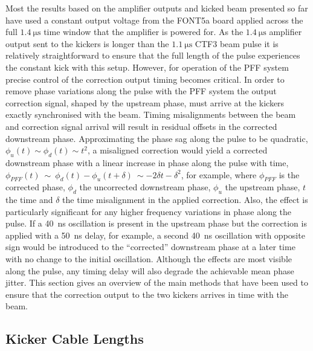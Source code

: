 
Most the results based on the amplifier outputs and kicked beam presented so far have used a constant output voltage from the FONT5a board applied across the full \(1.4~\mathrm{\mu s}\) time window that the amplifier is powered for. As the \(1.4~\mathrm{\mu s}\) amplifier output sent to the kickers is longer than the \(1.1~\mathrm{\mu s}\) CTF3 beam pulse it is relatively straightforward to ensure that the full length of the pulse experiences the constant kick with this setup. However, for operation of the PFF system precise control of the correction output timing becomes critical. In order to remove phase variations along the pulse with the PFF system the output correction signal, shaped by the upstream phase, must arrive at the kickers exactly synchronised with the beam. Timing misalignments between the beam and correction signal arrival will result in residual offsets in the corrected downstream phase. Approximating the phase sag along the pulse to be quadratic, \(\phi_{u}(t) \sim \phi_{d}(t) \sim t^2\), a misaligned correction would yield a corrected downstream phase with a linear increase in phase along the pulse with time, \(\phi_{PFF}(t)~\sim~\phi_d(t)-\phi_u(t+\delta)~\sim -2\delta t - \delta^2\), for example, where \(\phi_{PFF}\) is the corrected phase, \(\phi_{d}\) the uncorrected downstream phase, \(\phi_{u}\) the upstream phase, \(t\) the time and \(\delta\) the time misalignment in the applied correction. Also, the effect is particularly significant for any higher frequency variations in phase along the pulse. If a 40~ns oscillation is present in the upstream phase but the correction is applied with a 50~ns delay, for example, a second 40~ns oscillation with opposite sign would be introduced to the ``corrected'' downstream phase at a later time with no change to the initial oscillation. Although the effects are most visible along the pulse, any timing delay will also degrade the achievable mean phase jitter. This section gives an overview of the main methods that have been used to ensure that the correction output to the two kickers arrives in time with the beam. 

\subsection{Kicker Cable Lengths}
\label{ss:kickerCables}

